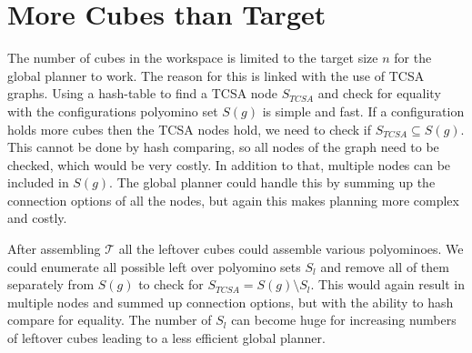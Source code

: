 \section{More Cubes than Target}
\label{sec:more_cubes}

The number of cubes in the workspace is limited to the target size $n$ for the global planner to work.
The reason for this is linked with the use of TCSA graphs. 
Using a hash-table to find a TCSA node $S_{\textit{TCSA}}$ and check for equality with the configurations polyomino set $S(g)$ is simple and fast.
If a configuration holds more cubes then the TCSA nodes hold, we need to check if $S_{\textit{TCSA}} \subseteq S(g)$.
This cannot be done by hash comparing, so all nodes of the graph need to be checked, which would be very costly.
In addition to that, multiple nodes can be included in $S(g)$.
The global planner could handle this by summing up the connection options of all the nodes, but again this makes planning more complex and costly.

After assembling $\mathcal{T}$ all the leftover cubes could assemble various polyominoes.
We could enumerate all possible left over polyomino sets $S_l$ and remove all of them separately from $S(g)$ to check for $S_{\textit{TCSA}} = S(g) \setminus S_l$.
This would again result in multiple nodes and summed up connection options, but with the ability to hash compare for equality.
The number of $S_l$ can become huge for increasing numbers of leftover cubes leading to a less efficient global planner.




